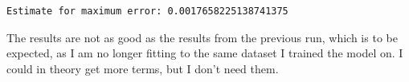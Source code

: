 \documentclass[11pt]{article}
\begin{document}
    \begin{Verbatim}[commandchars=\\\{\}]
Estimate for maximum error: 0.0017658225138741375
    \end{Verbatim}

    The results are not as good as the results from the previous run, which
is to be expected, as I am no longer fitting to the same dataset I
trained the model on. I could in theory get more terms, but I don't need
them.


    
    
    
\end{document}
